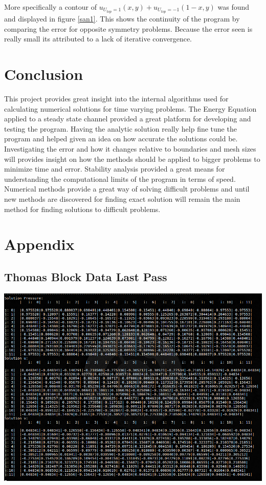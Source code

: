 \documentclass[paper=a4, fontsize=11pt, abstract=on]{scrartcl}
\numberwithin{equation}{section}		%
\numberwithin{figure}{section}			%
\numberwithin{table}{section}				%
\begin{document}
More specifically a contour of $u_{U_{top} = 1}(x,y) + u_{U_{top} = -1}(1-x,y)$ was found and displayed in figure \ref{san1}. This shows the continuity of the program by comparing the error for opposite symmetry problems. Because the error seen is really small its attributed to a lack of iterative convergence.

\section{Conclusion}
This project provides great insight into the internal algorithms used for calculating numerical solutions for time varying problems. The Energy Equation applied to a steady state channel provided a great platform for developing and testing the program. Having the analytic solution really help fine tune the program and helped given an idea on how accurate the solutions could be. Investigating the error and how it changes relative to boundaries and mesh sizes will provides insight on how the methods should be applied to bigger problems to minimize time and error. Stability analysis provided a great means for understanding the computational limits of the program in terms of speed. Numerical methods provide a great way of solving difficult problems and until new methods are discovered for finding exact solution will remain the main method for finding solutions to difficult problems. 





\newpage
\appendix
\section{Appendix} \label{App:Appendix}
\subsection{Thomas Block Data Last Pass}
\includegraphics[width=0.95\linewidth]{tom}
\end{document}
